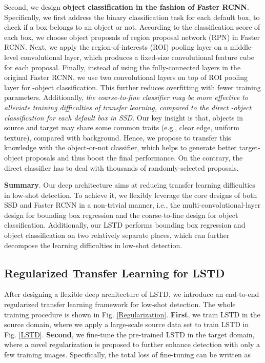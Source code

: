 \documentclass[letterpaper]{article} \usepackage{aaai18}  \usepackage{times}  \usepackage{helvet}  \usepackage{courier}  \usepackage{url}  \usepackage{graphicx}
\begin{document}
Second,
we design \textbf{object classification in the fashion of Faster RCNN}.
Specifically,
we first address the binary classification task for each default box,
to check if a box belongs to an object or not.
According to the classification score of each box,
we choose object proposals of region proposal network (RPN) in Faster RCNN.
Next,
we apply the region-of-interests (ROI) pooling layer on a middle-level convolutional layer,
which produces a fixed-size convolutional feature cube for each proposal.
Finally,
instead of using the fully-connected layers in the original Faster RCNN,
we use two convolutional layers on top of ROI pooling layer for -object classification.
This further reduces overfitting with fewer training parameters.
Additionally,
\textit{the coarse-to-fine classifier may be more effective to alleviate training difficulties of transfer learning,
compared to the direct -object classification for each default box in SSD}.
Our key insight is that,
objects in source and target may share some common traits (e.g., clear edge, uniform texture),
compared with background.
Hence,
we propose to transfer this knowledge with the object-or-not classifier,
which helps to generate better target-object proposals and thus boost the final performance.
On the contrary,
the direct  classifier has to deal with thousands of randomly-selected proposals.







\textbf{Summary}.
Our deep architecture aims at reducing transfer learning difficulties in low-shot detection.
To achieve it,
we flexibly leverage the core designs of both SSD and Faster RCNN in a non-trivial manner,
i.e.,
the multi-convolutional-layer design for bounding box regression and the coarse-to-fine design for object classification.
Additionally,
our LSTD performs bounding box regression and object classification on two relatively separate places,
which can further decompose the learning difficulties in low-shot detection.






\subsection{Regularized Transfer Learning for LSTD}
\label{Transfer Learning with Low-Shot Detection Regularization}

After designing a flexible deep architecture of LSTD,
we introduce an end-to-end regularized transfer learning framework for low-shot detection.
The whole training procedure is shown in Fig. \ref{Regularization}.
\textbf{First},
we train LSTD in the source domain,
where
we apply a large-scale source data set to train LSTD in Fig. \ref{LSTD}.
\textbf{Second},
we fine-tune the pre-trained LSTD in the target domain,
where a novel regularization is proposed to further enhance detection with only a few training images.
Specifically,
the total loss of fine-tuning can be written as
\end{document}
